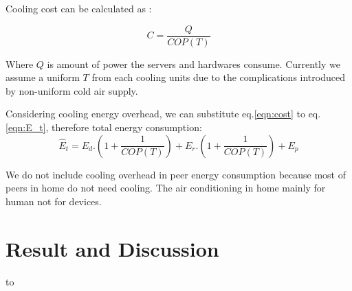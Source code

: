\documentclass[conference]{IEEEtran}
\begin{document}
Cooling cost can be calculated as  \cite{moore2005making} :

\begin{equation}\label{eqn:cost}
C = \frac{Q}{COP(T)}
\end{equation}

Where $Q$ is amount of power the servers and hardwares consume.
Currently we assume a uniform $T$ from each cooling units due to the complications introduced by non-uniform cold air supply.

Considering cooling energy overhead, we can substitute eq.\ref{eqn:cost} to eq.\ref{eqn:E_t}, therefore total energy consumption: 
\begin{equation}
	\hat{E}_{t} = E_{d}.\left( 1+\frac{1}{COP(T)} \right) + E_{r}.\left( 1+\frac{1}{COP(T)} \right) + E_p
\end{equation}

We do not include cooling overhead in peer energy consumption because most of peers in home do not need cooling.  
The air conditioning in home mainly for human not for devices.

\section{Result and Discussion}\label{analysis}

\begin{table}[htp!]
\caption{Numerical Simulation Parameters from \cite{Nedevschi:2008:HDC:1855610.1855618}, \cite{valancius2009greening},\cite{4509688}, and \cite{Sun:2009:POS:1542245.1542249}.}
\label{tab:simparameters}
\hbox to
\end{table}
\end{document}
